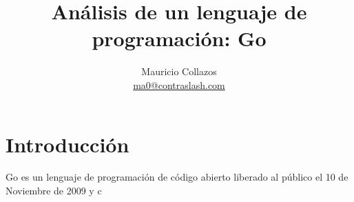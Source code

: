 \documentclass{article}
\author{Mauricio Collazos \\
\href{mailto:ma0@contraslash.com}{ma0@contraslash.com}}
\title{Análisis de un lenguaje de programación: Go}
\begin{document}
\maketitle
\section{Introducción}
Go es un lenguaje de programación de código abierto liberado al público el 10 de Noviembre de 2009 y c
\end{document}
